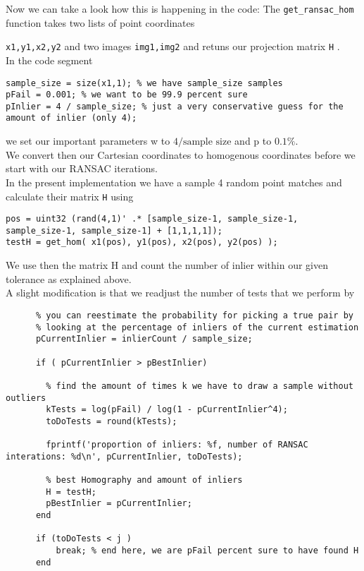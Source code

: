 \documentclass[a4paper]{scrartcl}
\newcommand{\matinl}[1]{
\lstinline[style=MyMatStyle,keywordstyle=\color{black},
stringstyle=keywordstyle=\color{black},commentstyle=\color{black},
numberstyle=\color{black}]{#1}
}
\begin{document}
Now we can take a look how this is happening in the code:
The \matinl{get_ransac_hom} function takes two lists of point coordinates 
\matinl{x1,y1,x2,y2} and two images \matinl{img1,img2} and retuns our 
projection matrix \matinl{H}.\\
In the code segment
\begin{lstlisting}[style=MyMatStyle,float=!h]
sample_size = size(x1,1); % we have sample_size samples
pFail = 0.001; % we want to be 99.9 percent sure
pInlier = 4 / sample_size; % just a very conservative guess for the amount of inlier (only 4);
\end{lstlisting}
\FloatBarrier
we set our important parameters w to $4/\text{sample size}$ and p to $0.1\%$.\\
We convert then our Cartesian coordinates to homogenous coordinates before we 
start with our RANSAC iterations.\\
In the present implementation we have a sample 4 random point matches and 
calculate their matrix \matinl{H} using
\begin{lstlisting}[style=MyMatStyle,float=!h]
pos = uint32 (rand(4,1)' .* [sample_size-1, sample_size-1, sample_size-1, sample_size-1] + [1,1,1,1]);
testH = get_hom( x1(pos), y1(pos), x2(pos), y2(pos) );
\end{lstlisting}
\FloatBarrier
We use then the matrix H and count the number of inlier within our given 
tolerance as explained above.\\
A slight modification is that we readjust the number of tests that we perform by
\begin{lstlisting}[style=MyMatStyle,float=!h]
      % adjust maximal iterations to be made
      % you can reestimate the probability for picking a true pair by
      % looking at the percentage of inliers of the current estimation
      pCurrentInlier = inlierCount / sample_size;

      if ( pCurrentInlier > pBestInlier)

        % find the amount of times k we have to draw a sample without outliers
        kTests = log(pFail) / log(1 - pCurrentInlier^4);
        toDoTests = round(kTests);

        fprintf('proportion of inliers: %f, number of RANSAC interations: %d\n', pCurrentInlier, toDoTests);

        % best Homography and amount of inliers
        H = testH;
        pBestInlier = pCurrentInlier;
      end

      if (toDoTests < j ) 
          break; % end here, we are pFail percent sure to have found H
      end
\end{lstlisting}
\end{document}
